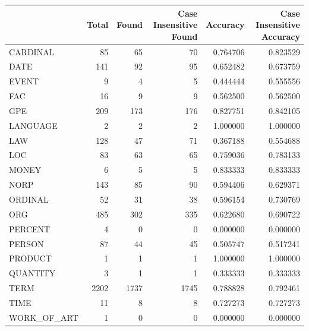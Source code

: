 \begin{tabular}{lrrrrr}
\toprule
 & Total & Found & Case Insensitive Found & Accuracy & Case Insensitive Accuracy \\
\midrule
CARDINAL & 85 & 65 & 70 & 0.764706 & 0.823529 \\
DATE & 141 & 92 & 95 & 0.652482 & 0.673759 \\
EVENT & 9 & 4 & 5 & 0.444444 & 0.555556 \\
FAC & 16 & 9 & 9 & 0.562500 & 0.562500 \\
GPE & 209 & 173 & 176 & 0.827751 & 0.842105 \\
LANGUAGE & 2 & 2 & 2 & 1.000000 & 1.000000 \\
LAW & 128 & 47 & 71 & 0.367188 & 0.554688 \\
LOC & 83 & 63 & 65 & 0.759036 & 0.783133 \\
MONEY & 6 & 5 & 5 & 0.833333 & 0.833333 \\
NORP & 143 & 85 & 90 & 0.594406 & 0.629371 \\
ORDINAL & 52 & 31 & 38 & 0.596154 & 0.730769 \\
ORG & 485 & 302 & 335 & 0.622680 & 0.690722 \\
PERCENT & 4 & 0 & 0 & 0.000000 & 0.000000 \\
PERSON & 87 & 44 & 45 & 0.505747 & 0.517241 \\
PRODUCT & 1 & 1 & 1 & 1.000000 & 1.000000 \\
QUANTITY & 3 & 1 & 1 & 0.333333 & 0.333333 \\
TERM & 2202 & 1737 & 1745 & 0.788828 & 0.792461 \\
TIME & 11 & 8 & 8 & 0.727273 & 0.727273 \\
WORK_OF_ART & 1 & 0 & 0 & 0.000000 & 0.000000 \\
\bottomrule
\end{tabular}
